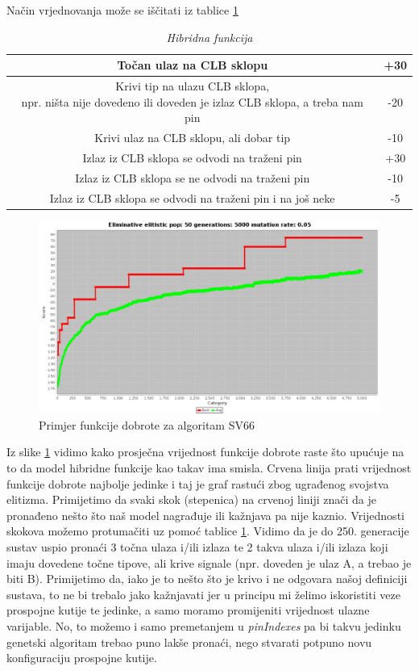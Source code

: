 \documentclass[times, utf8, zavrsni]{fer}
\begin{document}
	Način vrjednovanja može se iščitati iz tablice \ref{HibridnaFunkcija}
	
	
	\begin{table}[htb]
		\caption{\emph{Hibridna funkcija}}
		\label{HibridnaFunkcija}
		\centering
		\begin{tabular}{|c | c|} \hline
			Točan ulaz na CLB sklopu & +30 \\ \hline
			\makecell{Krivi tip na ulazu CLB sklopa, \\ npr. ništa nije dovedeno ili doveden je izlaz CLB sklopa, a treba nam pin} & -20 \\ \hline
			Krivi ulaz na CLB sklopu, ali dobar tip& -10 \\ \hline
			Izlaz iz CLB sklopa se odvodi na traženi pin & +30 \\ \hline
			Izlaz iz CLB sklopa se ne odvodi na traženi pin & -10 \\ \hline 
			Izlaz iz CLB sklopa se odvodi na traženi pin i na još neke & -5
		\end{tabular}
	\end{table}
	
	\begin{figure}[H]
		\centering
		\includegraphics[width=18cm]{slike/SV66Hibrid.png}
		\caption{Primjer funkcije dobrote za algoritam SV66}
		\label{fig:sv66-alg-hibrid}
	\end{figure} 
	
	Iz slike \ref{fig:sv66-alg-hibrid} vidimo kako prosječna vrijednost funkcije dobrote raste što upućuje na to da model hibridne funkcije kao takav ima smisla. Crvena linija prati vrijednost funkcije dobrote najbolje jedinke i taj je graf rastući zbog ugrađenog svojstva elitizma. Primijetimo da svaki skok (stepenica) na crvenoj liniji znači da je pronađeno nešto što naš model nagrađuje ili kažnjava pa nije kaznio. Vrijednosti skokova možemo protumačiti uz pomoć tablice \ref{HibridnaFunkcija}. Vidimo da je do 250. generacije sustav uspio pronaći 3 točna ulaza i/ili izlaza te 2 takva ulaza i/ili izlaza koji imaju dovedene točne tipove, ali krive signale (npr. doveden je ulaz A, a trebao je biti B). Primijetimo da, iako je to nešto što je krivo i ne odgovara našoj definiciji sustava, to ne bi trebalo jako kažnjavati jer u principu mi želimo iskoristiti veze prospojne kutije te jedinke, a samo moramo promijeniti vrijednost ulazne varijable. No, to možemo i samo premetanjem u \emph{pinIndexes} pa bi takvu jedinku genetski algoritam trebao puno lakše pronaći, nego stvarati potpuno novu konfiguraciju prospojne kutije. 
	
\end{document}
